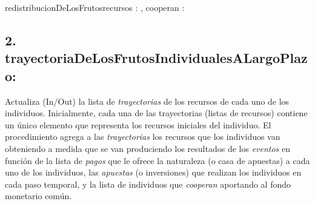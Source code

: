 \documentclass[10pt,a4paper]{article}
\begin{document}
	\begin{proc}{redistribucionDeLosFrutos}{\In recursos : \TLista{\float}, \In cooperan : \TLista{\bool}}{\TLista{\float}}
		\hfill 
	
		{ 
		}

		\hfill 
		

		\hfill 


		

	\end{proc}
	
	\subsection*{2. trayectoriaDeLosFrutosIndividualesALargoPlazo:}
	Actualiza (In/Out) la lista de 
	\textit{trayectorias}
	de los recursos de cada uno de los individuos. Inicialmente, cada una de las trayectorias (listas de recursos) contiene un único elemento que representa los recursos iniciales
	del individuo. El procedimiento agrega a las 
	\textit{trayectorias}
	los recursos que los individuos van obteniendo a medida que se van produciendo los resultados de los 
	\textit{eventos}
	en función de la lista de 
	\textit{pagos}
	que le ofrece la naturaleza (o casa de apuestas) a cada uno de los individuos, las 
	\textit{apuestas}
	(o inversiones) que realizan los individuos en cada paso temporal, y la lista de individuos que 
	\textit{cooperan}
	aportando al fondo monetario común.
\end{document}
